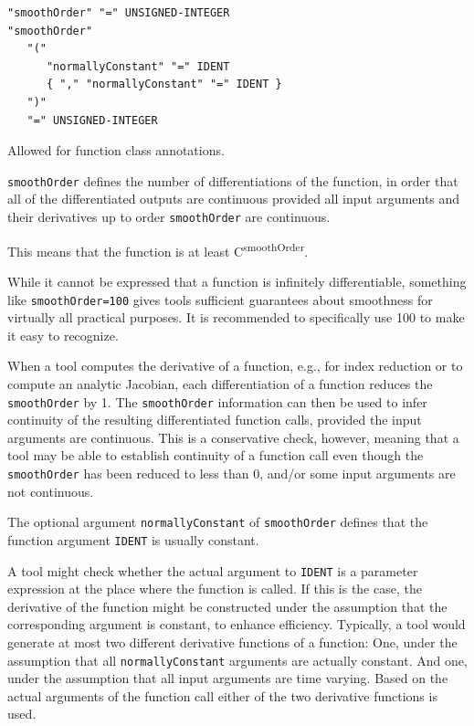 \begin{annotationdefinition}[smoothOrder]
\begin{synopsis}[grammar]\begin{lstlisting}
"smoothOrder" "=" UNSIGNED-INTEGER
"smoothOrder"
   "("
      "normallyConstant" "=" IDENT
      { "," "normallyConstant" "=" IDENT }
   ")"
   "=" UNSIGNED-INTEGER
\end{lstlisting}\end{synopsis}
\begin{semantics}
Allowed for function class annotations.

{\lstinline!smoothOrder!} defines the number of differentiations of the function, in order that all of the differentiated outputs are continuous provided all input arguments and their derivatives up to order {\lstinline!smoothOrder!} are continuous.

\begin{nonnormative}
This means that the function is at least C\textsuperscript{smoothOrder}.

While it cannot be expressed that a function is infinitely differentiable, something like \lstinline!smoothOrder=100! gives tools sufficient guarantees about smoothness for virtually all practical purposes.
It is recommended to specifically use 100 to make it easy to recognize.

When a tool computes the derivative of a function, e.g., for index reduction or to compute an analytic Jacobian, each differentiation of a function reduces the \lstinline!smoothOrder! by 1.
The \lstinline!smoothOrder! information can then be used to infer continuity of the resulting differentiated function calls, provided the input arguments are continuous.
This is a conservative check, however, meaning that a tool may be able to establish continuity of a function call even though the \lstinline!smoothOrder! has been reduced to less than 0, and/or some input arguments are not continuous.
\end{nonnormative}

The optional argument {\lstinline!normallyConstant!} of {\lstinline!smoothOrder!} defines that the function argument {\lstinline!IDENT!} is usually constant.

\begin{nonnormative}
A tool might check whether the actual argument to {\lstinline!IDENT!} is a parameter expression at the place where the function is called.
If this is the case, the derivative of the function might be constructed under the assumption that the corresponding argument is constant, to enhance efficiency.
Typically, a tool would generate at most two different derivative functions of a function:
One, under the assumption that all {\lstinline!normallyConstant!} arguments are actually constant.
And one, under the assumption that all input arguments are time varying.
Based on the actual arguments of the function call either of the two derivative functions is used.


\end{nonnormative}
\end{semantics}
\end{annotationdefinition}

